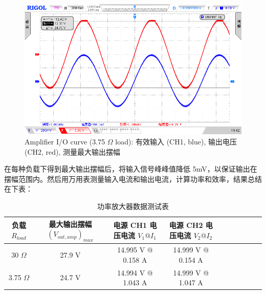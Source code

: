 \documentclass[UTF8]{article}
\begin{document}
\begin{figure}[H]\centering
    \includegraphics[width=\columnwidth]{LCE-03-功率放大器/assets/实验照片/3R5输出测试 最大输出摆幅 (测量输出).png}
    \caption{Amplifier I/O curve (3.75 $\Omega$ load): 有效输入 (CH1, blue), 输出电压 (CH2, red), 测量最大输出摆幅}
\end{figure}

在每种负载下得到最大输出摆幅后，将输入信号峰峰值降低 5mV，以保证输出在摆幅范围内。然后用万用表测量输入电流和输出电流，计算功率和效率，结果总结在下表：

\begin{table}[H]\centering
    \caption{功率放大器数据测试表}
    \label{功率放大器数据测试表}
\begin{tabular}{cccccccccc}\toprule
    负载 $R_{load}$  & 最大输出摆幅 $(V_{out,amp})_{max}$ & 电源 CH1 电压电流 $V_1 @ I_1$ & 电源 CH2 电压电流 $V_2 @ I_2$ \\
    \midrule
    30 $\Omega$ & 27.9 V & 14.995 V @ 0.158 A & 14.999 V @ 0.154 A  \\
    3.75 $\Omega$ & 24.7 V & 14.994 V @ 1.043 A & 14.999 V @ 1.047 A \\
    \bottomrule
\end{tabular}
\end{table}

\begin{table}[H]\centering
    \caption{功率放大器输出摆幅、功率和效率测试}
    \label{功率放大器输出摆幅、功率和效率测试}
\end{table}
\end{document}
